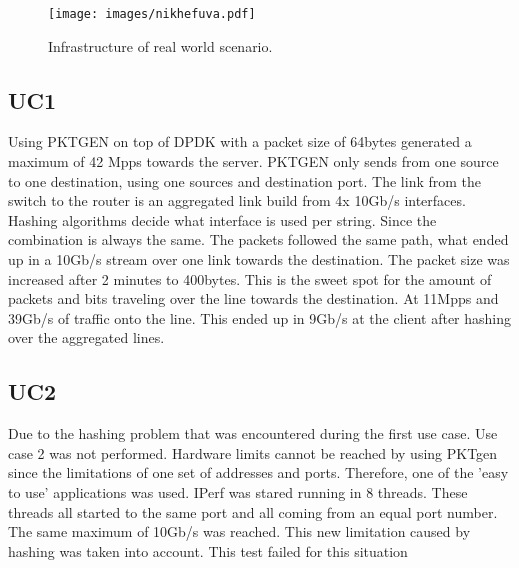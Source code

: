 \begin{figure}
  \texttt{[image: images/nikhefuva.pdf]}
  \caption{Infrastructure of real world scenario.}
  \label{fig:nikhefuva}
\end{figure}

\subsection{UC1}
Using PKTGEN on top of DPDK with a packet size of 64bytes generated a maximum of 42 Mpps towards the server. PKTGEN only sends from one source to one destination, using one sources and destination port. The link from the switch to the router is an aggregated link build from 4x 10Gb/s interfaces. Hashing algorithms decide what interface is used per string. Since the combination is always the same. The packets followed the same path, what ended up in a 10Gb/s stream over one link towards the destination. The packet size was increased after 2 minutes to 400bytes. This is the sweet spot for the amount of packets and bits traveling over the line towards the destination. At 11Mpps and 39Gb/s of traffic onto the line. This ended up in 9Gb/s at the client after hashing over the aggregated lines.  


\subsection{UC2}
Due to the hashing problem that was encountered during the first use case. Use case 2 was not performed. Hardware limits cannot be reached by using PKTgen since the limitations of one set of addresses and ports. Therefore, one of the 'easy to use' applications was used. IPerf was stared running in 8 threads. These threads all started to the same port and all coming from an equal port number. The same maximum of 10Gb/s was reached. This new limitation caused by hashing was taken into account. This test failed for this situation

